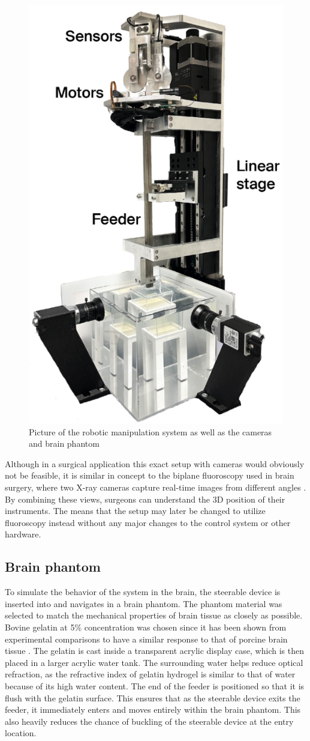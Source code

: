 \begin{figure} [H]
    \centering
    \includegraphics[width=0.5\linewidth]{images/Hardware/insertionStrategy.PNG}
    \caption{Picture of the robotic manipulation system as well as the cameras and brain phantom}
    \label{fig:roboticmanipulationsystem}
\end{figure}

Although in a surgical application this exact setup with cameras would obviously not be feasible, it is similar in concept to the biplane fluoroscopy used in brain surgery, where two X-ray cameras capture real-time images from different angles \cite{weise_intraoperative_2012}. By combining these views, surgeons can understand the 3D position of their instruments. The means that the setup may later be changed to utilize fluoroscopy instead without any major changes to the control system or other hardware.

\subsection{Brain phantom}
To simulate the behavior of the system in the brain, the steerable device is inserted into and navigates in a brain phantom. The phantom material was selected to match the mechanical properties of brain tissue as closely as possible. Bovine gelatin at 5\% concentration was chosen since it has been shown from experimental comparisons to have a similar response to that of porcine brain tissue \cite{singh_comparison_2019}.
\newline \newline
The gelatin is cast inside a transparent acrylic display case, which is then placed in a larger acrylic water tank. The surrounding water helps reduce optical refraction, as the refractive index of gelatin hydrogel is similar to that of water because of its high water content. The end of the feeder is positioned so that it is flush with the gelatin surface. This ensures that as the steerable device exits the feeder, it immediately enters and moves entirely within the brain phantom. This also heavily reduces the chance of buckling of the steerable device at the entry location.


